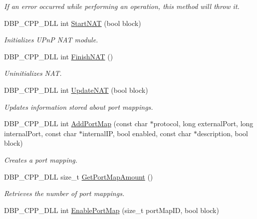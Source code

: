 \begin{DoxyCompactItemize}
\begin{DoxyCompactList}\small\item\em If an error occurred while performing an operation, this method will throw it. \item\end{DoxyCompactList}\item 
DBP\_\-CPP\_\-DLL int \hyperlink{namespacemn_n_a_t_a6f874ce55f2055c92494b9f959e189e0}{StartNAT} (bool block)
\begin{DoxyCompactList}\small\item\em Initializes UPnP NAT module. \item\end{DoxyCompactList}\item 
DBP\_\-CPP\_\-DLL int \hyperlink{namespacemn_n_a_t_a28e1d77839663d749e473a3298a7b12f}{FinishNAT} ()
\begin{DoxyCompactList}\small\item\em Uninitializes NAT. \item\end{DoxyCompactList}\item 
DBP\_\-CPP\_\-DLL int \hyperlink{namespacemn_n_a_t_a03ddf47374677d349b0468f3f6d8f2e8}{UpdateNAT} (bool block)
\begin{DoxyCompactList}\small\item\em Updates information stored about port mappings. \item\end{DoxyCompactList}\item 
DBP\_\-CPP\_\-DLL int \hyperlink{namespacemn_n_a_t_a814eac3685422d65c29bb651b3859d5f}{AddPortMap} (const char $\ast$protocol, long externalPort, long internalPort, const char $\ast$internalIP, bool enabled, const char $\ast$description, bool block)
\begin{DoxyCompactList}\small\item\em Creates a port mapping. \item\end{DoxyCompactList}\item 
DBP\_\-CPP\_\-DLL size\_\-t \hyperlink{namespacemn_n_a_t_afda3af12d37a7a9676da4b04361947e6}{GetPortMapAmount} ()
\begin{DoxyCompactList}\small\item\em Retrieves the number of port mappings. \item\end{DoxyCompactList}\item 
DBP\_\-CPP\_\-DLL int \hyperlink{namespacemn_n_a_t_a0bb597938cc5b7d83f5c94f5b42bbf0b}{EnablePortMap} (size\_\-t portMapID, bool block)

\end{DoxyCompactItemize}
